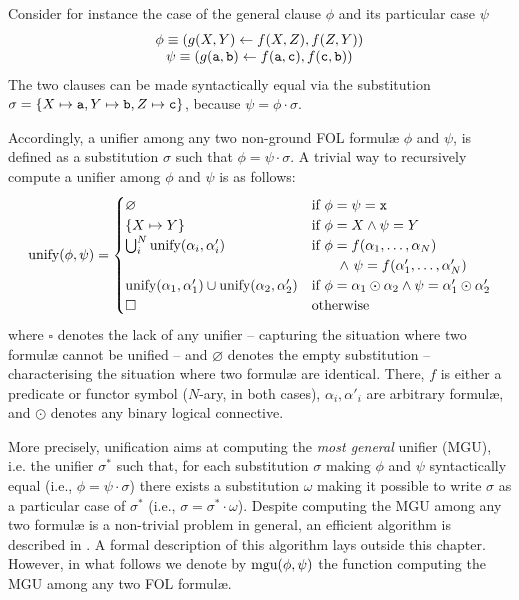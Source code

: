\documentclass[12pt,a4paper,openright,twoside]{book}
\begin{document}
Consider for instance the case of the general clause $\phi$ and its particular case $\psi$
%
\begin{equation*}
    \begin{array}{c}
        \phi \equiv (g(X, Y) \leftarrow f(X, Z), f(Z, Y))
        \\
        \psi \equiv (g(\mathtt{a}, \mathtt{b}) \leftarrow f(\mathtt{a}, \mathtt{c}), f(\mathtt{c}, \mathtt{b}))
    \end{array}
\end{equation*}
%
The two clauses can be made syntactically equal via the substitution $\sigma = \{ X \mapsto \mathtt{a}, Y \mapsto \mathtt{b}, Z \mapsto \mathtt{c} \}$, because $\psi = \phi \cdot \sigma$.

Accordingly, a unifier among any two non-ground FOL formul\ae{} $\phi$ and $\psi$, is defined as a substitution $\sigma$ such that $\phi = \psi \cdot \sigma$.
%
A trivial way to recursively compute a unifier among $\phi$ and $\psi$ is as follows:
%
\begin{equation}
    \text{unify}(\phi, \psi) = \begin{cases}
        \varnothing & \text{if} ~ \phi = \psi = \mathtt{x}
        \\
        \{ X \mapsto Y \} & \text{if} ~ \phi = X \wedge \psi = Y
        \\
        \bigcup_{i}^{N} \text{unify}(\alpha_i, \alpha'_i) & \text{if} ~ \phi = f(\alpha_1, \ldots, \alpha_N)
        \\
        & \qquad \wedge\ \psi = f(\alpha'_1, \ldots, \alpha'_N)
        \\
        \text{unify}(\alpha_1, \alpha'_1) \cup \text{unify}(\alpha_2, \alpha'_2)  & \text{if} ~ \phi = \alpha_1 \odot \alpha_2 \wedge \psi = \alpha'_1 \odot \alpha'_2
        \\
        \square & \text{otherwise}
    \end{cases}
\end{equation}
%
where $\square$ denotes the lack of any unifier -- capturing the situation where two formul\ae{} cannot be unified -- and $\varnothing$ denotes the empty substitution -- characterising the situation where two formul\ae{} are identical.
%
There, $f$ is either a predicate or functor symbol ($N$-ary, in both cases), $\alpha_i, \alpha'_i$ are arbitrary formul\ae{}, and $\odot$ denotes any binary logical connective.

More precisely, unification aims at computing the \emph{most general} unifier (MGU), i.e. the unifier $\sigma^*$ such that, for each substitution $\sigma$ making $\phi$ and $\psi$ syntactically equal (i.e., $\phi = \psi \cdot \sigma$) there exists a substitution $\omega$ making it possible to write $\sigma$ as a particular case of $\sigma^*$ (i.e., $\sigma = \sigma^* \cdot \omega$).
%
Despite computing the MGU among any two formul\ae{} is a non-trivial problem in general, an efficient algorithm is described in \cite{MartelliMontanari1982}.
%
A formal description of this algorithm lays outside this chapter.
%
However, in what follows we denote by $\text{mgu}(\phi, \psi)$ the function computing the MGU among any two FOL formul\ae{}.
\end{document}
